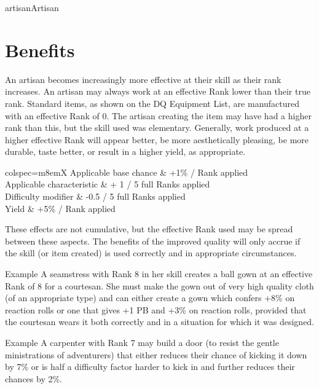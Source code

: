 \begin{Skill}[2.0]{artisan}{Artisan}
\begin{Description}
\end{Description}

\section{Benefits}

An artisan becomes increasingly more effective at their skill as their
rank increases.  An artisan may always work at an effective Rank lower
than their true rank.  Standard items, as shown on the DQ Equipment
List, are manufactured with an effective Rank of 0. The artisan
creating the item may have had a higher rank than this, but the skill
used was elementary.  Generally, work produced at a higher effective
Rank will appear better, be more aesthetically pleasing, be more
durable, taste better, or result in a higher yield, as appropriate.

\begin{dqtblr}{colspec={m{8em}X}}
Applicable base chance		& +1\% / Rank applied \\
Applicable characteristic	& + 1 / 5 full Ranks applied \\
Difficulty modifier		& -0.5 / 5 full Ranks applied \\
Yield				& +5\% / Rank applied \\
\end{dqtblr}

These effects are not cumulative, but the effective Rank used may be
spread between these aspects.  The benefits of the improved quality
will only accrue if the skill (or item created) is used correctly and
in appropriate circumstances.

\begin{Description}

\item[Example] A seamstress with Rank 8 in her skill creates a ball
  gown at an effective Rank of 8 for a courtesan.  She must make the
  gown out of very high quality cloth (of an appropriate type) and can
  either create a gown which confers +8\% on reaction rolls or one
  that gives +1 PB and +3\% on reaction rolls, provided that the
  courtesan wears it both correctly and in a situation for which it
  was designed.

\item[Example] A carpenter with Rank 7 may build a door (to resist the
  gentle ministrations of adventurers) that either reduces their
  chance of kicking it down by 7\% or is half a difficulty factor
  harder to kick in and further reduces their chances by 2\%.


\end{Description}
\end{Skill}
